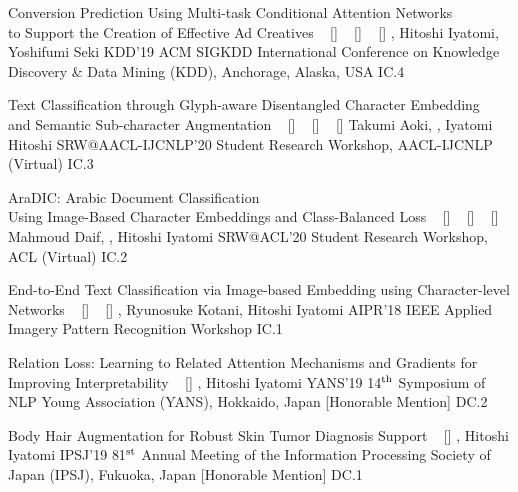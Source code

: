 \begin{publications}
    \publication
    {Conversion Prediction Using Multi-task Conditional Attention Networks \\ to Support the Creation of Effective Ad Creatives}
    {
    ~ [\href{https://dl.acm.org/doi/10.1145/3292500.3330789}{\small{\linkSymbol}}]
    ~ [\href{https://arxiv.org/abs/1905.07289}{\small{\arxivSymbol}}]
    ~ [\href{https://github.com/shunk031/Multi-task-Conditional-Attention-Networks}{\small{\githubSymbol}}]
    }
    {\underline{}, Hitoshi Iyatomi, Yoshifumi Seki}
    {KDD'19} {ACM SIGKDD International Conference on Knowledge Discovery \& Data Mining (KDD), Anchorage, Alaska, USA} {IC.4}

    \publication
    {Text Classification through Glyph-aware Disentangled Character Embedding \\ and Semantic Sub-character Augmentation}
    {
    ~ [\href{https://aclanthology.org/2020.aacl-srw.1/}{\small{\linkSymbol}}]
    ~ [\href{https://arxiv.org/abs/2011.04184}{\small{\arxivSymbol}}]
    ~ [\href{https://github.com/IyatomiLab/GDCE-SSA}{\small{\githubSymbol}}]
    }
    {Takumi Aoki, \underline{}, Iyatomi Hitoshi}
    {SRW@AACL-IJCNLP'20} {Student Research Workshop, AACL-IJCNLP (Virtual)} {IC.3}

    \publication
    {AraDIC: Arabic Document Classification \\ Using Image-Based Character Embeddings and Class-Balanced Loss}
    {
    ~ [\href{https://aclanthology.org/2020.acl-srw.29/}{\small{\linkSymbol}}]
    ~ [\href{https://arxiv.org/abs/2006.11586}{\small{\arxivSymbol}}]
    ~ [\href{https://github.com/IyatomiLab/GDCE-SSA}{\small{\githubSymbol}}]
    }
    {Mahmoud Daif, \underline{}, Hitoshi Iyatomi}
    {SRW@ACL'20} {Student Research Workshop, ACL (Virtual)} {IC.2}

    \publication
    {End-to-End Text Classification via Image-based Embedding using Character-level Networks}
    {
    ~ [\href{https://ieeexplore.ieee.org/document/8707407}{\small{\linkSymbol}}]
    ~ [\href{https://arxiv.org/abs/1810.03595}{\small{\arxivSymbol}}]
    }
    {\underline{}, Ryunosuke Kotani, Hitoshi Iyatomi}
    {AIPR'18} {IEEE Applied Imagery Pattern Recognition Workshop} {IC.1}

    \publication
    {Relation Loss: Learning to Related Attention Mechanisms and Gradients for Improving Interpretability}
    {
    ~ [\href{https://www.hosei.ac.jp/gs/NEWS/zaigaku/koganei/20190920/}{\small{\linkSymbol}}]
    }
    {\underline{}, Hitoshi Iyatomi}
    {YANS'19} {14$^{\textrm{\scriptsize th}}$ Symposium of NLP Young Association (YANS), Hokkaido, Japan [Honorable Mention]} {DC.2}

    \publication
    {Body Hair Augmentation for Robust Skin Tumor Diagnosis Support}
    {
    ~ [\href{https://www.hosei.ac.jp/gs/NEWS/topics/jusho/190411_4/}{\small{\linkSymbol}}]
    }
    {\underline{}, Hitoshi Iyatomi}
    {IPSJ'19} {81$^{\textrm{\scriptsize st}}$ Annual Meeting of the Information Processing Society of Japan (IPSJ), Fukuoka, Japan [Honorable Mention]} {DC.1}

\end{publications}

